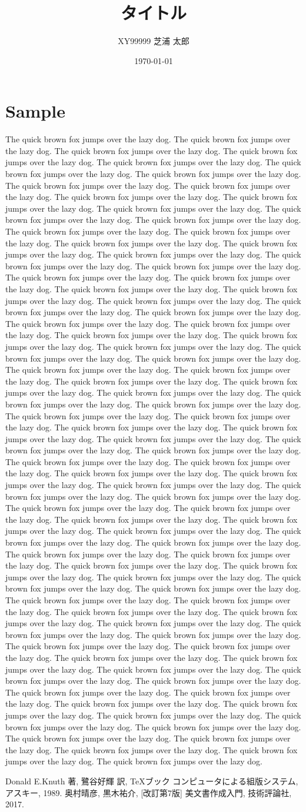 \documentclass[twocolumn, a4paper, 9pt, dvipdfmx]{jsarticle}
\title{タイトル}
\date{\today}
\author{XY99999 \quad 芝浦 太郎}
\begin{document}
\maketitle
\thispagestyle{empty}

\newcommand{\TQBF}{The quick brown fox jumps over the lazy dog. }
\section{Sample}
\TQBF \TQBF \TQBF \TQBF \TQBF \TQBF \TQBF \TQBF
\TQBF \TQBF \TQBF \TQBF \TQBF \TQBF \TQBF \TQBF
\TQBF \TQBF \TQBF \TQBF \TQBF \TQBF \TQBF \TQBF
\TQBF \TQBF \TQBF \TQBF \TQBF \TQBF \TQBF \TQBF
\TQBF \TQBF \TQBF \TQBF \TQBF \TQBF \TQBF \TQBF
\TQBF \TQBF \TQBF \TQBF \TQBF \TQBF \TQBF \TQBF
\TQBF \TQBF \TQBF \TQBF \TQBF \TQBF \TQBF \TQBF
\TQBF \TQBF \TQBF \TQBF \TQBF \TQBF \TQBF \TQBF
\TQBF \TQBF \TQBF \TQBF \TQBF \TQBF \TQBF \TQBF
\TQBF \TQBF \TQBF \TQBF \TQBF \TQBF \TQBF \TQBF
\TQBF \TQBF \TQBF \TQBF \TQBF \TQBF \TQBF \TQBF
\TQBF \TQBF \TQBF \TQBF \TQBF \TQBF \TQBF \TQBF

\begin{thebibliography}{1}
     Donald E.Knuth 著, 鷺谷好輝 訳, \TeX ブック コンピュータによる組版システム, アスキー, 1989.
     奥村晴彦, 黒木祐介, [改訂第7版] \LaTeXe 美文書作成入門, 技術評論社, 2017.
\end{thebibliography}
\end{document}
